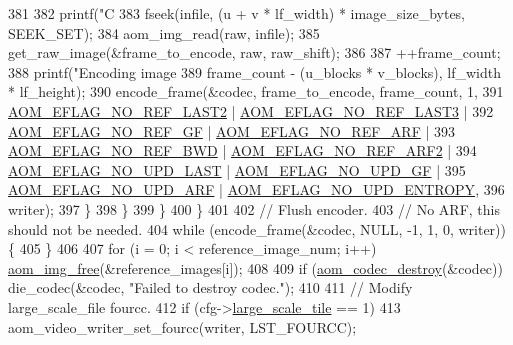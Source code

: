 \begin{DoxyCodeInclude}
{{{{{{{381 
382           printf(\textcolor{stringliteral}{"C%
383           fseek(infile, (u + v * lf\_width) * image\_size\_bytes, SEEK\_SET);
384           aom\_img\_read(raw, infile);
385           get\_raw\_image(&frame\_to\_encode, raw, raw\_shift);
386 
387           ++frame\_count;
388           printf(\textcolor{stringliteral}{"Encoding image %
389                  frame\_count - (u\_blocks * v\_blocks), lf\_width * lf\_height);
390           encode\_frame(&codec, frame\_to\_encode, frame\_count, 1,
391                        \hyperlink{group__aom__encoder_ga50c2560ca6670298cfc614ecae96a391}{AOM\_EFLAG\_NO\_REF\_LAST2} | 
      \hyperlink{group__aom__encoder_gaa4bc8ae2b977b73f0ef57ba428ca1d2c}{AOM\_EFLAG\_NO\_REF\_LAST3} |
392                            \hyperlink{group__aom__encoder_gaaef6fe76991abf87edd2f296eee999f8}{AOM\_EFLAG\_NO\_REF\_GF} | 
      \hyperlink{group__aom__encoder_ga9e2f989737d63ddf4e987a525d186a46}{AOM\_EFLAG\_NO\_REF\_ARF} |
393                            \hyperlink{group__aom__encoder_ga758649aa6cd9fefb15ad888489884a38}{AOM\_EFLAG\_NO\_REF\_BWD} | 
      \hyperlink{group__aom__encoder_gad04799a74215e1b9609f7ccd1766f8c9}{AOM\_EFLAG\_NO\_REF\_ARF2} |
394                            \hyperlink{group__aom__encoder_ga7a55a46970c074b761319c5c46d87b6e}{AOM\_EFLAG\_NO\_UPD\_LAST} | 
      \hyperlink{group__aom__encoder_gaa81cc31f95fd463f51a158050d267a36}{AOM\_EFLAG\_NO\_UPD\_GF} |
395                            \hyperlink{group__aom__encoder_ga469b4cf5ff76cb30de951e129c25a786}{AOM\_EFLAG\_NO\_UPD\_ARF} | 
      \hyperlink{group__aom__encoder_gac5a69f04b0bc88f755587a1da815d754}{AOM\_EFLAG\_NO\_UPD\_ENTROPY},
396                        writer);
397         \}
398       \}
399     \}
400   \}
401 
402   \textcolor{comment}{// Flush encoder.}
403   \textcolor{comment}{// No ARF, this should not be needed.}
404   \textcolor{keywordflow}{while} (encode\_frame(&codec, NULL, -1, 1, 0, writer)) \{
405   \}
406 
407   \textcolor{keywordflow}{for} (i = 0; i < reference\_image\_num; i++) \hyperlink{aom__image_8h_afff22f7f3eb9409c5b678d1962f110a8}{aom\_img\_free}(&reference\_images[i]);
408 
409   \textcolor{keywordflow}{if} (\hyperlink{group__codec_ga9b60e186f61ba2d6ab2b8069b76a15c5}{aom\_codec\_destroy}(&codec)) die\_codec(&codec, \textcolor{stringliteral}{"Failed to destroy codec."});
410 
411   \textcolor{comment}{// Modify large\_scale\_file fourcc.}
412   \textcolor{keywordflow}{if} (cfg->\hyperlink{structaom__codec__enc__cfg_af4583da6c145778f822a4a61db28c40a}{large\_scale\_tile} == 1)
413     aom\_video\_writer\_set\_fourcc(writer, LST\_FOURCC);
}}}}}}}}}
\end{DoxyCodeInclude}
